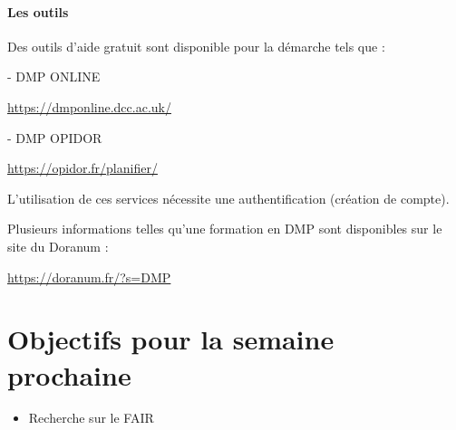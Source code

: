 \documentclass[11pt,oneside]{article}
\begin{document}
\subsection*{Les outils}

\begin{flushleft}
Des outils d’aide gratuit sont disponible pour la démarche tels que :
\end{flushleft}

-	DMP ONLINE

\begin{flushleft}
\url{https://dmponline.dcc.ac.uk/}\hypersetup {colorlinks=true,linkcolor=blue,urlcolor=blue}
\end{flushleft}

-	DMP OPIDOR

\begin{flushleft}
\url{https://opidor.fr/planifier/}\hypersetup {colorlinks=true,linkcolor=blue,urlcolor=blue}
\end{flushleft}

\begin{flushleft}
L’utilisation de ces services nécessite une authentification (création de compte).
\end{flushleft}

\begin{flushleft}
Plusieurs informations telles qu’une formation en DMP sont disponibles sur le site du Doranum :
\end{flushleft}

\begin{flushleft}
\url{https://doranum.fr/?s=DMP}\hypersetup {colorlinks=true,linkcolor=blue,urlcolor=blue}
\end{flushleft}

\newpage
\part*{Objectifs pour la semaine prochaine}
\begin{itemize}
	\item Recherche sur le FAIR
\end{itemize}
\end{document}
